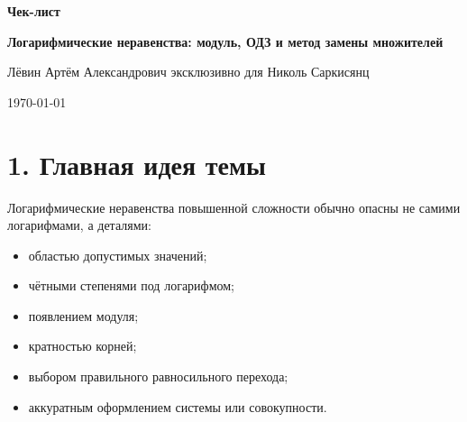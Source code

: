 \documentclass[a4paper,12pt]{article}
\newcommand{\topic}{Логарифмические неравенства: модуль, ОДЗ и метод замены множителей}
\newcommand{\student}{Николь Саркисянц}
\newcommand{\teacher}{Лёвин Артём Александрович}
\begin{document}
\begin{titlepage}
\thispagestyle{empty}
\centering

\vspace*{35mm}

{\Large\textcolor{accent}{\textbf{Чек-лист}}\par}

\vspace{8mm}

{\Huge\textbf{\topic}\par}

\vspace{12mm}

{\large \teacher{} эксклюзивно для \student\par}

\vspace{8mm}

{\large \today\par}

\vfill


\end{titlepage}

\section*{1. Главная идея темы}

Логарифмические неравенства повышенной сложности обычно опасны не самими логарифмами, а деталями:

\begin{itemize}
  \item областью допустимых значений;
  \item чётными степенями под логарифмом;
  \item появлением модуля;
  \item кратностью корней;
  \item выбором правильного равносильного перехода;
  \item аккуратным оформлением системы или совокупности.
\end{itemize}
\end{document}
